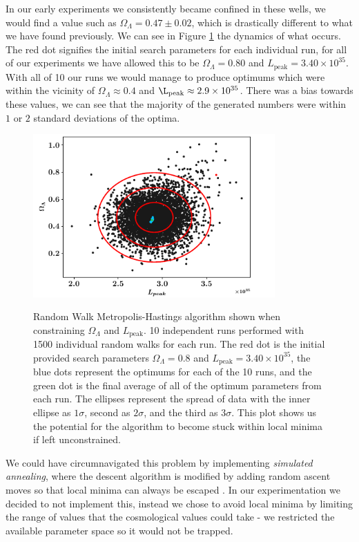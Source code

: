 \documentclass[twocolumn]{revtex4}
\begin{document}
{In our early experiments we consistently became confined in these wells, we would find a value such as $\Omega_\Lambda=0.47\pm0.02$, which is drastically different to what we have found previously. We can see in Figure \ref{fig:mcmc_search} the dynamics of what occurs. The red dot signifies the initial search parameters for each individual run, for all of our experiments we have allowed this to be $\Omega_\Lambda=0.80$ and $L_\text{peak}=3.40\times10^{35}$. With all of 10 our runs we would manage to produce optimums which were within the vicinity of $\Omega_\Lambda \approx 0.4$ and $\L_\text{peak}\approx2.9\times10^{35}$. There was a bias towards these values, we can see that the majority of the generated numbers were within $1$ or $2$ standard deviations of the optima.

\begin{figure}[!h]
\begin{center}
\includegraphics[width=9.25cm]{results/ol_lp_complete}
\caption[]{Random Walk Metropolis-Hastings algorithm shown when constraining $\Omega_\Lambda$ and $L_\text{peak}$. 10 independent runs performed with 1500 individual random walks for each run. The red dot is the initial provided search parameters $\Omega_\Lambda=0.8$ and $L_\text{peak}=3.40\times10^{35}$, the blue dots represent the optimums for each of the 10 runs, and the green dot is the final average of all of the optimum parameters from each run. The ellipses represent the spread of data with the inner ellipse as $1\sigma$, second as $2\sigma$, and the third as $3\sigma$. This plot shows us the potential for the algorithm to become stuck within local minima if left unconstrained. }
\vspace{-5ex}
\label{fig:mcmc_search}
\end{center}
\end{figure}

We could have circumnavigated this problem by implementing \textit{simulated annealing}, where the descent algorithm is modified by adding random ascent moves so that local minima can always be escaped \cite{simulated_annealing}. In our experimentation we decided to not implement this, instead we chose to avoid local minima by limiting the range of values that the cosmological values could take - we restricted the available parameter space so it would not be trapped.

}
\end{document}
